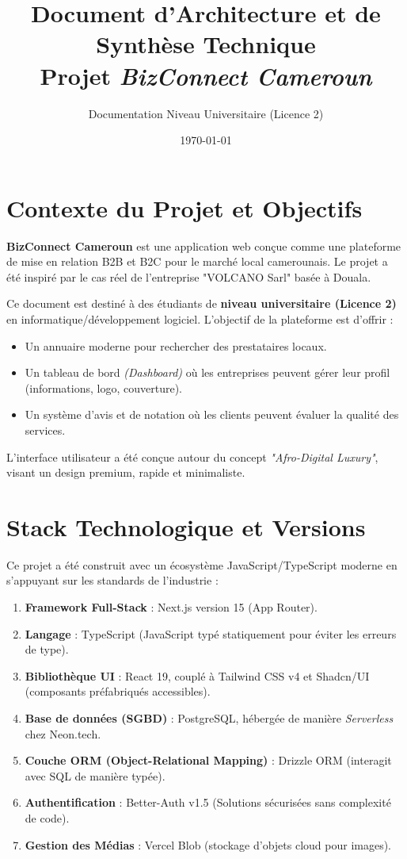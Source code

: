 \documentclass[12pt,a4paper]{article}
\title{\textbf{Document d'Architecture et de Synthèse Technique}\\ \large Projet \textit{BizConnect Cameroun}}
\author{Documentation Niveau Universitaire (Licence 2)}
\date{\today}
\begin{document}
\maketitle
\tableofcontents
\newpage

\section{Contexte du Projet et Objectifs}
\textbf{BizConnect Cameroun} est une application web conçue comme une plateforme de mise en relation B2B et B2C pour le marché local camerounais. Le projet a été inspiré par le cas réel de l'entreprise "VOLCANO Sarl" basée à Douala.

Ce document est destiné à des étudiants de \textbf{niveau universitaire (Licence 2)} en informatique/développement logiciel. L'objectif de la plateforme est d'offrir :
\begin{itemize}
    \item Un annuaire moderne pour rechercher des prestataires locaux.
    \item Un tableau de bord \textit{(Dashboard)} où les entreprises peuvent gérer leur profil (informations, logo, couverture).
    \item Un système d'avis et de notation où les clients peuvent évaluer la qualité des services.
\end{itemize}
L'interface utilisateur a été conçue autour du concept \textit{"Afro-Digital Luxury"}, visant un design premium, rapide et minimaliste.

\section{Stack Technologique et Versions}
Ce projet a été construit avec un écosystème JavaScript/TypeScript moderne en s'appuyant sur les standards de l'industrie :

\begin{tcolorbox}[colback=blue!5!white,colframe=blue!75!black,title=Technologies Clés]
\begin{enumerate}
    \item \textbf{Framework Full-Stack} : Next.js version 15 (App Router).
    \item \textbf{Langage} : TypeScript (JavaScript typé statiquement pour éviter les erreurs de type).
    \item \textbf{Bibliothèque UI} : React 19, couplé à Tailwind CSS v4 et Shadcn/UI (composants préfabriqués accessibles).
    \item \textbf{Base de données (SGBD)} : PostgreSQL, hébergée de manière \textit{Serverless} chez Neon.tech.
    \item \textbf{Couche ORM (Object-Relational Mapping)} : Drizzle ORM (interagit avec SQL de manière typée).
    \item \textbf{Authentification} : Better-Auth v1.5 (Solutions sécurisées sans complexité de code).
    \item \textbf{Gestion des Médias} : Vercel Blob (stockage d'objets cloud pour images).
\end{enumerate}
\end{tcolorbox}
\end{document}
